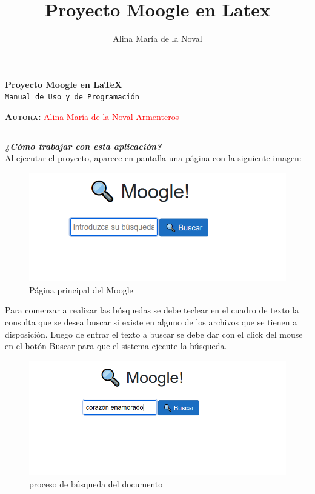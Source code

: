 \documentclass[spanish,10pt,a4paper]{article}
\title{Proyecto Moogle en Latex}
\author{Alina María de la Noval}
\begin{document}
	
	\begin{center}
		\textcolor{rojo}{\Huge\textbf{Proyecto Moogle en \LaTeX}}\\
		\vspace{0,5cm}
		\textcolor{tractorred}{\texttt{\Large{Manual de Uso y de Programación}}}\\
		\vspace{0,7cm}
		\raggedright\textcolor{rojo}{\textsc{\Large\textbf{\ul{Autora:}}}} \hspace{4mm} \textcolor{red}{\huge Alina María de la Noval Armenteros}\\
	\end{center}
	
	\begin{center}
		\textcolor{rojo}{\rule{150mm}{0,7mm}}
	\end{center}
	
	\vspace{0,8cm}
	\textsl{\textbf{\Large¿Cómo trabajar con esta aplicación?}}\\
	\large Al ejecutar el proyecto, aparece en pantalla una página con la siguiente imagen:
	\begin{figure}[H]
		\centering
		\includegraphics{img.png}
		\caption{Página principal del Moogle}
		\label{fig: Figura 1}
	\end{figure}
	
	
	Para comenzar a realizar las búsquedas se debe teclear en el cuadro de texto la consulta que se desea buscar si existe en alguno de los archivos que se tienen a disposición.
	Luego de entrar el texto a buscar se debe dar con el click del mouse en el botón Buscar para que el sistema ejecute la búsqueda.
	
	\begin{figure}[H]
		\centering
		\includegraphics{img2.png}
		\caption{proceso de búsqueda del documento}
		\label{fig: Figura 2}
	\end{figure}
	
\end{document}
